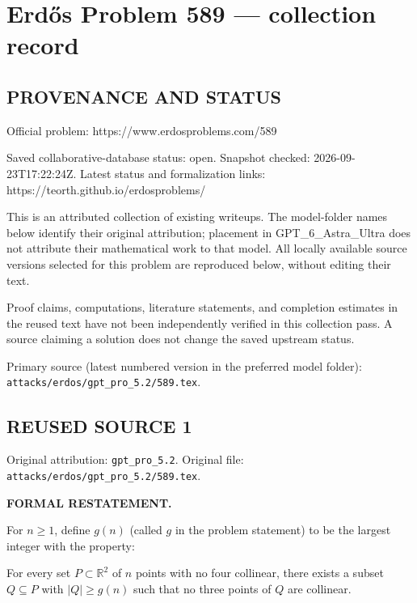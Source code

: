 \section*{Erd\H{o}s Problem 589 --- collection record}

\subsection*{PROVENANCE AND STATUS}
Official problem: https://www.erdosproblems.com/589

Saved collaborative-database status: open.
Snapshot checked: 2026-09-23T17:22:24Z.
Latest status and formalization links: https://teorth.github.io/erdosproblems/

This is an attributed collection of existing writeups. The model-folder names below identify their original attribution; placement in GPT\_6\_Astra\_Ultra does not attribute their mathematical work to that model. All locally available source versions selected for this problem are reproduced below, without editing their text.

Proof claims, computations, literature statements, and completion estimates in the reused text have not been independently verified in this collection pass. A source claiming a solution does not change the saved upstream status.

Primary source (latest numbered version in the preferred model folder): \texttt{attacks/erdos/gpt\_pro\_5.2/589.tex}.

\subsection*{REUSED SOURCE 1}
Original attribution: \texttt{gpt\_pro\_5.2}.
Original file: \texttt{attacks/erdos/gpt\_pro\_5.2/589.tex}.


\noindent\textbf{FORMAL RESTATEMENT.}

For $n\ge 1$, define $g(n)$ (called $g$ in the problem statement) to be the largest integer with the property:

For every set $P\subset\mathbb{R}^2$ of $n$ points with no four collinear, there exists a subset $Q\subseteq P$ with $|Q|\ge g(n)$ such that no three points of $Q$ are collinear.

